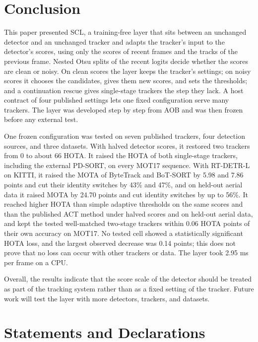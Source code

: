 \documentclass[pdflatex,sn-mathphys-num,iicol]{sn-jnl}
\newcommand{\scl}{SCL}
\newcommand{\aob}{AOB}
\begin{document}
\section{Conclusion}\label{sec:conclusion}

This paper presented \scl{}, a training-free layer that sits between an unchanged detector and an
unchanged tracker and adapts the tracker's input to the detector's scores, using only the scores of
recent frames and the tracks of the previous frame. Nested Otsu splits of the recent logits decide
whether the scores are clean or noisy. On clean scores the layer keeps the tracker's settings; on
noisy scores it chooses the candidates, gives them new scores, and sets the thresholds; and a
continuation rescue gives single-stage trackers the step they lack. A host contract of four
published settings lets one fixed configuration serve many trackers. The layer was developed step
by step from \aob{} and was then frozen before any external test.

One frozen configuration was tested on seven published trackers, four detection sources, and three
datasets. With halved detector scores, it restored two trackers from 0 to about 66 HOTA. It raised
the HOTA of both single-stage trackers, including the external PD-SORT, on every MOT17 sequence.
With RT-DETR-L on KITTI, it raised the MOTA of ByteTrack and BoT-SORT by 5.98 and 7.86 points and
cut their identity switches by 43\% and 47\%, and on held-out aerial data it raised MOTA by 24.70
points and cut identity switches by up to 56\%. It reached higher HOTA than simple adaptive
thresholds on the same scores and than the published ACT method under halved scores and on
held-out aerial data, and kept the tested well-matched two-stage trackers within 0.06 HOTA points
of their own accuracy on MOT17. No tested cell showed a statistically significant HOTA loss, and the
largest observed decrease was 0.14 points; this does not prove that no loss can occur with other
trackers or data. The layer took 2.95 ms per frame on a CPU.

Overall, the results indicate that the score scale of the detector should be treated as part of
the tracking system rather than as a fixed setting of the tracker. Future work will test the layer with
more detectors, trackers, and datasets.

\backmatter

\section*{Statements and Declarations}
\end{document}
